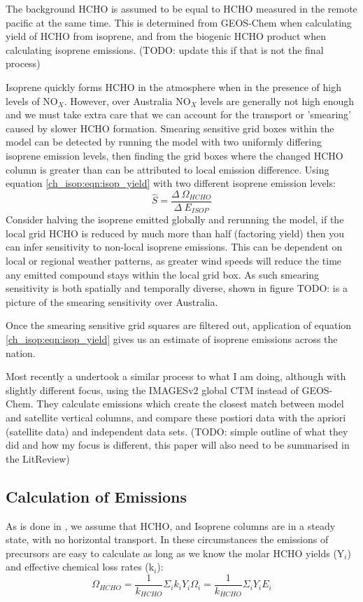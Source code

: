     The background HCHO is assumed to be equal to HCHO measured in the remote pacific at the same time.
    This is determined from GEOS-Chem when calculating yield of HCHO from isoprene, and from the biogenic HCHO product when calculating isoprene emissions. (TODO: update this if that is not the final process)
    
    Isoprene quickly forms HCHO in the atmosphere when in the presence of high levels of NO$_X$.
    However, over Australia NO$_X$ levels are generally not high enough and we must take extra care that we can account for the transport or 'smearing' caused by slower HCHO formation.
    Smearing sensitive grid boxes within the model can be detected by running the model with two uniformly differing isoprene emission levels, then finding the grid boxes where the changed HCHO column is greater than can be attributed to local emission difference.
    Using equation \ref{ch_isop:eqn:isop_yield} with two different isoprene emission levels:
    \begin{equation*}
      \hat{S} = \frac{\Delta~\Omega_{HCHO}}{\Delta~E_{ISOP}}
    \end{equation*}
    Consider halving the isoprene emitted globally and rerunning the model, if the local grid HCHO is reduced by much more than half (factoring yield) then you can infer sensitivity to non-local isoprene emissions.
    This can be dependent on local or regional weather patterns, as greater wind speeds will reduce the time any emitted compound stays within the local grid box.
    As such smearing sensitivity is both spatially and temporally diverse, shown in figure TODO: is a picture of the smearing sensitivity over Australia.
   
    Once the smearing sensitive grid squares are filtered out, application of equation \ref{ch_isop:eqn:isop_yield} gives us an estimate of isoprene emissions across the nation.
    
    Most recently a \citet{Bauwens2016} undertook a similar process to what I am doing, although with slightly different focus, using the IMAGESv2 global CTM instead of GEOS-Chem.
    They calculate emissions which create the closest match between model and satellite vertical columns, and compare these postiori data with the apriori (satellite data) and independent data sets.
    (TODO: simple outline of what they did and how my focus is different, this paper will also need to be summarised in the LitReview)
    
  \subsection{Calculation of Emissions}
    \label{ch_isop:sec:EmissionCalculation}
    As is done in \citet{Palmer2003, Millet2006, Bauwens2016}, we assume that HCHO, and Isoprene columns are in a steady state, with no horizontal transport.
    In these circumstances the emissions of precursors are easy to calculate as long as we know the molar HCHO yields (Y$_i$) and effective chemical loss rates (k$_i$):
    \begin{equation}
      \Omega_{HCHO} = \frac{1}{k_{HCHO}}\Sigma_i k_i Y_i \Omega_i = \frac{1}{k_{HCHO}}\Sigma_i Y_i E_i
    \end{equation}
    
